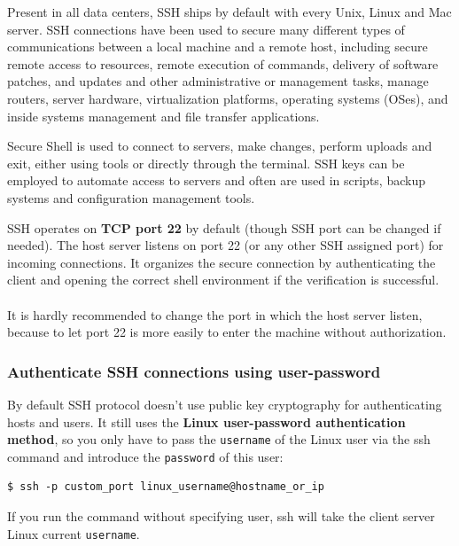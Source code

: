 \documentclass{article}
\newenvironment{blocktemplate}[1]{%
    \tcolorbox[beamer,%
    noparskip,breakable,
    colframe=Blue,%
    colbacklower=LimeGreen!75!LightGreen,%
    title=#1]}%
    {\endtcolorbox}
\newenvironment{blocktemplateI}[1]{%
    \tcolorbox[beamer,%
    noparskip,breakable,
    colframe=Violet,%
    colbacklower=Black,%
    title=#1]}%
    {\endtcolorbox}
\newenvironment{codetemplate}[1][]{%
  \mybasecolorbox[#1]
  \itshape
}{%
  \endmybasecolorbox
}
\begin{document}
Present in all data centers, SSH ships by default with every Unix, Linux and Mac server. SSH connections have been used to secure many different types of communications between a local machine and a remote host, including secure remote access to resources, remote execution of commands, delivery of software patches, and updates and other administrative or management tasks, manage routers, server hardware, virtualization platforms, operating systems (OSes), and inside systems management and file transfer applications.

Secure Shell is used to connect to servers, make changes, perform uploads and exit, either using tools or directly through the terminal. SSH keys can be employed to automate access to servers and often are used in scripts, backup systems and configuration management tools.

\begin{blocktemplateI}{Note}

SSH operates on \textbf{TCP port 22} by default (though SSH port can be changed if needed). The host server listens on port 22 (or any other SSH assigned port) for incoming connections. It organizes the secure connection by authenticating the client and opening the correct shell environment if the verification is successful.
\\\\
It is hardly recommended to change the port in which the host server listen, because to let port 22 is more easily to enter the machine without authorization.
\end{blocktemplateI}

\subsubsection{Authenticate SSH connections using user-password}

By default SSH protocol doesn't use public key cryptography for authenticating hosts and users. It still uses the \textbf{Linux user-password authentication method}, so you only have to pass the \verb|username| of the Linux user via the ssh command and introduce the \verb|password| of this user:

\begin{codetemplate}{}
\begin{verbatim}
$ ssh -p custom_port linux_username@hostname_or_ip
\end{verbatim}
\end{codetemplate}

\begin{blocktemplate}{Note}
 If you run the command without specifying user, ssh will take the client server Linux current \verb|username|.
\end{blocktemplate}
\end{document}
